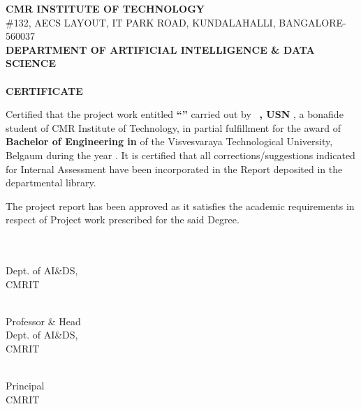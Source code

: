 \pagestyle{frontmatter}
{}
\begin{center}
\vspace*{0.3cm}
{\Large\bfseries CMR INSTITUTE OF TECHNOLOGY}\\[0.25em]
{\small \#132, AECS LAYOUT, IT PARK ROAD, KUNDALAHALLI, BANGALORE-560037}\\[0.25em]
{\bfseries\textcolor{deptRed}{DEPARTMENT OF ARTIFICIAL INTELLIGENCE \& DATA SCIENCE}}\\[1em]
\\[1em]
{\LARGE\bfseries CERTIFICATE}
\end{center}
\vspace{0.8em}
{
Certified that the project work entitled \textbf{``\ThesisTitle''} carried out by
\StudentHonorific\ \textbf{\StudentName, USN \USN}, a bonafide student of CMR Institute of
Technology, in partial fulfillment for the award of \textbf{Bachelor of Engineering in
\DegreeName} of the Visvesvaraya Technological University, Belgaum during the year
\AcademicYear. It is certified that all corrections/suggestions indicated for Internal
Assessment have been incorporated in the Report deposited in the departmental library.

The project report has been approved as it satisfies the academic requirements in respect of
Project work prescribed for the said Degree.\par}
\vspace{2.2cm}
\noindent
\begin{minipage}[t]{0.33\textwidth}\centering
\textbf{\GuideName}\\ \GuideTitle\\ Dept. of AI\&DS,\\ CMRIT
\end{minipage}%
\begin{minipage}[t]{0.33\textwidth}\centering
\textbf{\HodName}\\ Professor \& Head\\ Dept. of AI\&DS,\\ CMRIT
\end{minipage}%
\begin{minipage}[t]{0.33\textwidth}\centering
\textbf{\PrincipalName}\\ Principal\\ CMRIT
\end{minipage}

